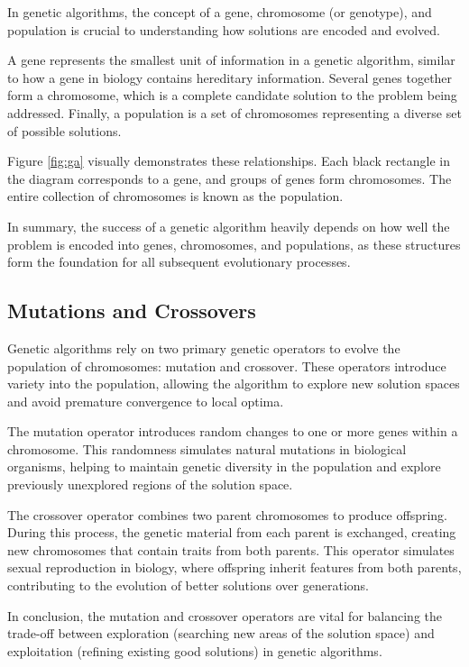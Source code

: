     In genetic algorithms, the concept of a gene, chromosome (or genotype), and population is crucial to understanding how solutions are encoded and evolved. 
    
    A gene represents the smallest unit of information in a genetic algorithm, similar to how a gene in biology contains hereditary information. Several genes together form a chromosome, which is a complete candidate solution to the problem being addressed. Finally, a population is a set of chromosomes representing a diverse set of possible solutions.
    
    Figure \ref{fig:ga} visually demonstrates these relationships. Each black rectangle in the diagram corresponds to a gene, and groups of genes form chromosomes. The entire collection of chromosomes is known as the population.
    
    
    
    In summary, the success of a genetic algorithm heavily depends on how well the problem is encoded into genes, chromosomes, and populations, as these structures form the foundation for all subsequent evolutionary processes.
    
    \subsection{Mutations and Crossovers}
    
    Genetic algorithms rely on two primary genetic operators to evolve the population of chromosomes: mutation and crossover. These operators introduce variety into the population, allowing the algorithm to explore new solution spaces and avoid premature convergence to local optima.
    
    The mutation operator introduces random changes to one or more genes within a chromosome. This randomness simulates natural mutations in biological organisms, helping to maintain genetic diversity in the population and explore previously unexplored regions of the solution space.
    
    The crossover operator combines two parent chromosomes to produce offspring. During this process, the genetic material from each parent is exchanged, creating new chromosomes that contain traits from both parents. This operator simulates sexual reproduction in biology, where offspring inherit features from both parents, contributing to the evolution of better solutions over generations.
    
    In conclusion, the mutation and crossover operators are vital for balancing the trade-off between exploration (searching new areas of the solution space) and exploitation (refining existing good solutions) in genetic algorithms.
